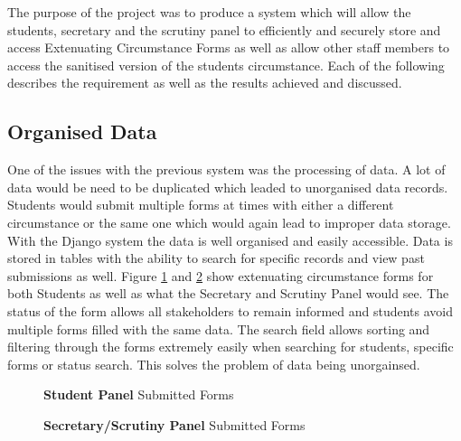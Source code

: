 \documentclass[../main.tex]{subfiles}
\begin{document}
\raggedright
The purpose of the project was to produce a system which will allow the students, secretary and the scrutiny panel to efficiently and securely store and access Extenuating Circumstance Forms as well as allow other staff members to access the sanitised version of the students circumstance. Each of the following describes the requirement as well as the results achieved and discussed.
     
\subsection*{Organised Data}
One of the issues with the previous system was the processing of data. A lot of data would be need to be duplicated which leaded to unorganised data records. Students would submit multiple forms at times with either a different circumstance or the same one which would again lead to improper data storage. With the Django system the data is well organised and easily accessible. Data is stored in tables with the ability to search for specific records and view past submissions as well.  Figure \ref{fig:ecfstudenttable} and \ref{fig:ecfsectable} show extenuating circumstance forms for both Students as well as what the Secretary and Scrutiny Panel would see. The status of the form allows all stakeholders to remain informed and students avoid multiple forms filled with the same data. The search field allows sorting and filtering through the forms extremely easily when searching for students, specific forms or status search. This solves the problem of data being unorgainsed. 

\begin{figure}[H]
        \caption{\label{fig:ecfstudenttable} \textbf{Student Panel} Submitted Forms}
      \end{figure}
 
\begin{figure}[H]
        \caption{\label{fig:ecfsectable} \textbf{Secretary/Scrutiny Panel} Submitted Forms}
      \end{figure}
\end{document}
